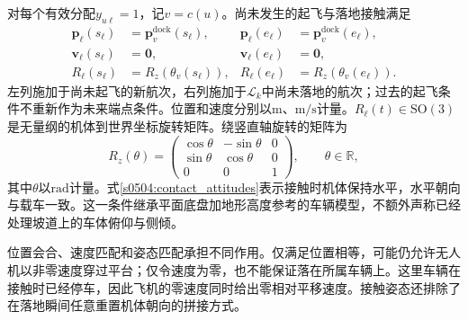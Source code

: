 对每个有效分配$y_{u\ell}=1$，记$v=c(u)$。尚未发生的起飞与落地接触满足
\begin{align}
 \mathbf p_\ell(s_\ell)&=\mathbf p_v^{\mathrm{dock}}(s_\ell),
 &\mathbf p_\ell(e_\ell)&=\mathbf p_v^{\mathrm{dock}}(e_\ell),
 \label{s0504:contact_positions}\\
 \mathbf v_\ell(s_\ell)&=\mathbf0,
 &\mathbf v_\ell(e_\ell)&=\mathbf0,
 \label{s0504:contact_velocities}\\
 R_\ell(s_\ell)&=R_z(\theta_v(s_\ell)),
 &R_\ell(e_\ell)&=R_z(\theta_v(e_\ell)).
 \label{s0504:contact_attitudes}
\end{align}
左列施加于尚未起飞的新航次，右列施加于$\mathcal L_k$中尚未落地的航次；过去的起飞条件不重新作为未来端点条件。位置和速度分别以$\mathrm m$、$\mathrm{m/s}$计量。$R_\ell(t)\in\mathrm{SO}(3)$是无量纲的机体到世界坐标旋转矩阵。绕竖直轴旋转的矩阵为
\begin{equation}
 R_z(\theta)=
 \begin{pmatrix}
 \cos\theta&-\sin\theta&0\\
 \sin\theta&\cos\theta&0\\
 0&0&1
 \end{pmatrix},
 \qquad \theta\in\mathbb R,
 \label{s0504:yaw_rotation}
\end{equation}
其中$\theta$以$\mathrm{rad}$计量。式\eqref{s0504:contact_attitudes}表示接触时机体保持水平，水平朝向与载车一致。这一条件继承平面底盘加地形高度参考的车辆模型，不额外声称已经处理坡道上的车体俯仰与侧倾。

位置会合、速度匹配和姿态匹配承担不同作用。仅满足位置相等，可能仍允许无人机以非零速度穿过平台；仅令速度为零，也不能保证落在所属车辆上。这里车辆在接触时已经停车，因此飞机的零速度同时给出零相对平移速度。接触姿态还排除了在落地瞬间任意重置机体朝向的拼接方式。

